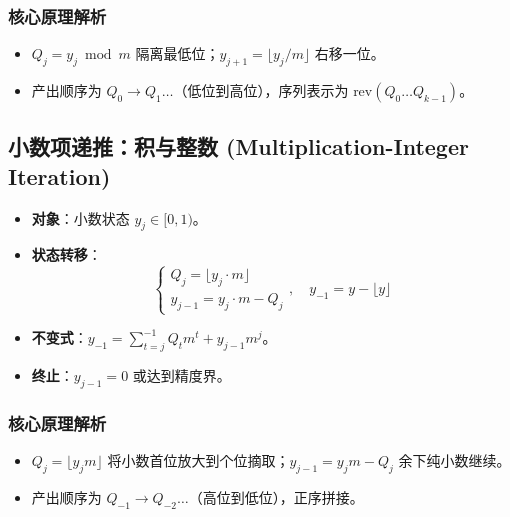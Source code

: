\subsubsection{核心原理解析}
\begin{itemize}
    \item $Q_j = y_j \bmod m$ 隔离最低位；$y_{j+1} = \lfloor y_j/m \rfloor$ 右移一位。
    \item 产出顺序为 $Q_0 \to Q_1 \dots$（低位到高位），序列表示为 $\text{rev}(Q_0\dots Q_{k-1})$。
\end{itemize}

\subsection{小数项递推：积与整数 (Multiplication-Integer Iteration)}

\begin{itemize}
    \item \textbf{对象}：小数状态 $y_j \in [0,1)$。
    \item \textbf{状态转移}：
$$\begin{cases}
Q_j = \lfloor y_j \cdot m \rfloor \\
y_{j-1} = y_j \cdot m - Q_j
\end{cases}, \quad y_{-1} = y - \lfloor y \rfloor$$
    \item \textbf{不变式}：$y_{-1} = \sum_{t=j}^{-1} Q_t m^t + y_{j-1} m^{j}$。
    \item \textbf{终止}：$y_{j-1}=0$ 或达到精度界。
\end{itemize}

\subsubsection{核心原理解析}
\begin{itemize}
    \item $Q_j = \lfloor y_j m \rfloor$ 将小数首位放大到个位摘取；$y_{j-1}=y_j m - Q_j$ 余下纯小数继续。
    \item 产出顺序为 $Q_{-1} \to Q_{-2} \dots$（高位到低位），正序拼接。
\end{itemize}